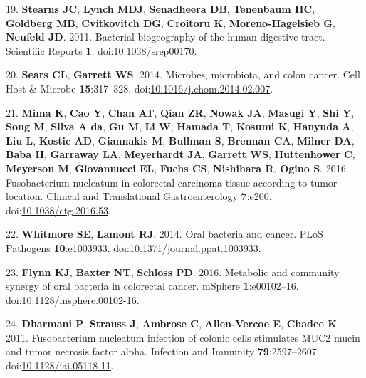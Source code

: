 \documentclass[11pt,]{article}
\begin{document}
\hypertarget{ref-Stearns2011}{}
19. \textbf{Stearns JC}, \textbf{Lynch MDJ}, \textbf{Senadheera DB},
\textbf{Tenenbaum HC}, \textbf{Goldberg MB}, \textbf{Cvitkovitch DG},
\textbf{Croitoru K}, \textbf{Moreno-Hagelsieb G}, \textbf{Neufeld JD}.
2011. Bacterial biogeography of the human digestive tract. Scientific
Reports \textbf{1}.
doi:\href{https://doi.org/10.1038/srep00170}{10.1038/srep00170}.

\hypertarget{ref-Sears2014}{}
20. \textbf{Sears CL}, \textbf{Garrett WS}. 2014. Microbes, microbiota,
and colon cancer. Cell Host \& Microbe \textbf{15}:317--328.
doi:\href{https://doi.org/10.1016/j.chom.2014.02.007}{10.1016/j.chom.2014.02.007}.

\hypertarget{ref-Mima2016}{}
21. \textbf{Mima K}, \textbf{Cao Y}, \textbf{Chan AT}, \textbf{Qian ZR},
\textbf{Nowak JA}, \textbf{Masugi Y}, \textbf{Shi Y}, \textbf{Song M},
\textbf{Silva A da}, \textbf{Gu M}, \textbf{Li W}, \textbf{Hamada T},
\textbf{Kosumi K}, \textbf{Hanyuda A}, \textbf{Liu L}, \textbf{Kostic
AD}, \textbf{Giannakis M}, \textbf{Bullman S}, \textbf{Brennan CA},
\textbf{Milner DA}, \textbf{Baba H}, \textbf{Garraway LA},
\textbf{Meyerhardt JA}, \textbf{Garrett WS}, \textbf{Huttenhower C},
\textbf{Meyerson M}, \textbf{Giovannucci EL}, \textbf{Fuchs CS},
\textbf{Nishihara R}, \textbf{Ogino S}. 2016. Fusobacterium nucleatum in
colorectal carcinoma tissue according to tumor location. Clinical and
Translational Gastroenterology \textbf{7}:e200.
doi:\href{https://doi.org/10.1038/ctg.2016.53}{10.1038/ctg.2016.53}.

\hypertarget{ref-Whitmore2014}{}
22. \textbf{Whitmore SE}, \textbf{Lamont RJ}. 2014. Oral bacteria and
cancer. PLoS Pathogens \textbf{10}:e1003933.
doi:\href{https://doi.org/10.1371/journal.ppat.1003933}{10.1371/journal.ppat.1003933}.

\hypertarget{ref-Flynn2016}{}
23. \textbf{Flynn KJ}, \textbf{Baxter NT}, \textbf{Schloss PD}. 2016.
Metabolic and community synergy of oral bacteria in colorectal cancer.
mSphere \textbf{1}:e00102--16.
doi:\href{https://doi.org/10.1128/msphere.00102-16}{10.1128/msphere.00102-16}.

\hypertarget{ref-Dharmani2011}{}
24. \textbf{Dharmani P}, \textbf{Strauss J}, \textbf{Ambrose C},
\textbf{Allen-Vercoe E}, \textbf{Chadee K}. 2011. Fusobacterium
nucleatum infection of colonic cells stimulates MUC2 mucin and tumor
necrosis factor alpha. Infection and Immunity \textbf{79}:2597--2607.
doi:\href{https://doi.org/10.1128/iai.05118-11}{10.1128/iai.05118-11}.
\end{document}
